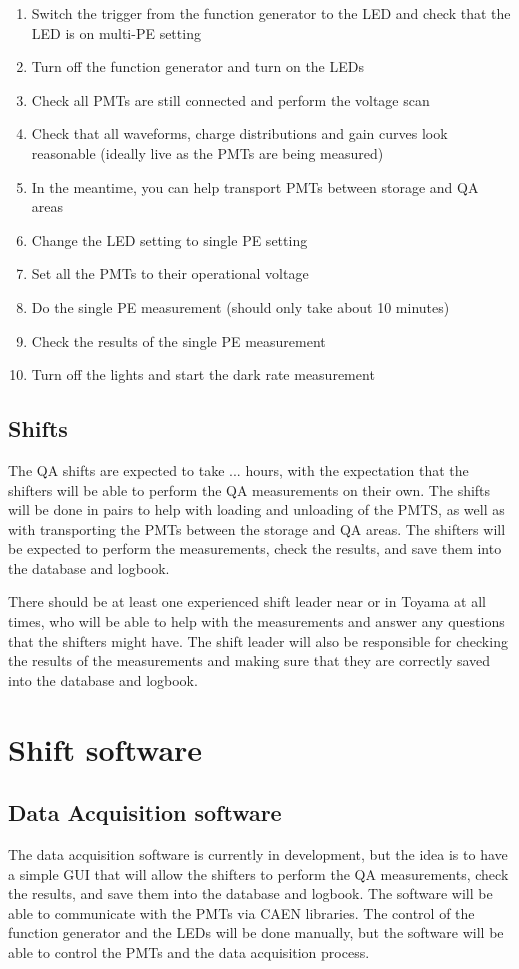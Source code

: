 \documentclass[12pt,a4paper]{article}
\begin{document}
\begin{enumerate}
    \item Switch the trigger from the function generator to the LED and check that the LED is on multi-PE setting
    \item Turn off the function generator and turn on the LEDs
    \item Check all PMTs are still connected and perform the voltage scan
    \item Check that all waveforms, charge distributions and gain curves look reasonable (ideally live as the PMTs are being measured)
    \item In the meantime, you can help transport PMTs between storage and QA areas
    \item Change the LED setting to single PE setting
    \item Set all the PMTs to their operational voltage
    \item Do the single PE measurement (should only take about 10 minutes)
    \item Check the results of the single PE measurement
    \item Turn off the lights and start the dark rate measurement
\end{enumerate}

\subsection{Shifts}
The QA shifts are expected to take ... hours, with the expectation that the shifters will be able to perform the QA measurements on their own. The shifts will be done in pairs to help with loading and unloading of the PMTS, as well as with transporting the PMTs between the storage and QA areas. The shifters will be expected to perform the measurements, check the results, and save them into the database and logbook.

There should be at least one experienced shift leader near or in Toyama at all times, who will be able to help with the measurements and answer any questions that the shifters might have. The shift leader will also be responsible for checking the results of the measurements and making sure that they are correctly saved into the database and logbook.

\section{Shift software}

\subsection{Data Acquisition software}
The data acquisition software is currently in development, but the idea is to have a simple GUI that will allow the shifters to perform the QA measurements, check the results, and save them into the database and logbook. The software will be able to communicate with the PMTs via CAEN libraries. The control of the function generator and the LEDs will be done manually, but the software will be able to control the PMTs and the data acquisition process.
\end{document}
